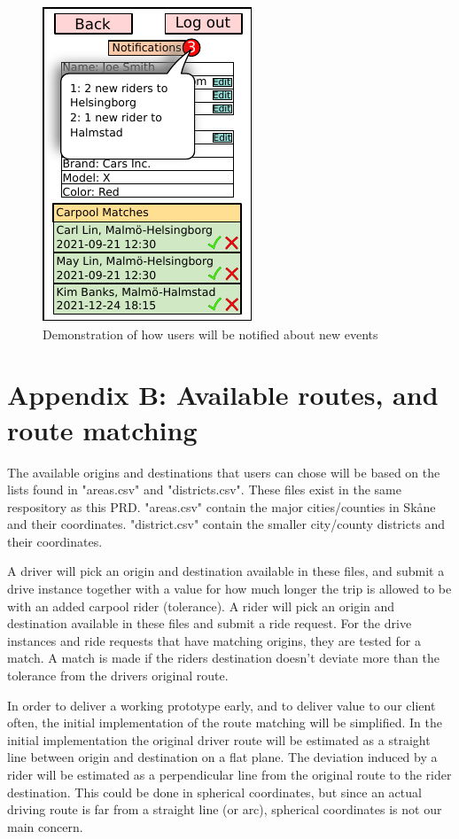 \documentclass{article}
\begin{document}
\begin{figure}[!htpb]
\begin{minipage}{0.25\textwidth}
        \centering
        \includegraphics[scale=1]{prdFigures/profile3.pdf}
        \caption{Demonstration of how users will be notified about new events}
        \label{fig:profile3}
    \end{minipage}\hfill
\end{figure}

\newpage
\section{Appendix B: Available routes, and route matching}
The available origins and destinations that users can chose will be based on the lists found in "areas.csv" and "districts.csv". These files exist in the same respository as this PRD. "areas.csv" contain the major cities/counties in Skåne and their coordinates. "district.csv" contain the smaller city/county districts and their coordinates.

A driver will pick an origin and destination available in these files, and submit a drive instance together with a value for how much longer the trip is allowed to be with an added carpool rider (tolerance). A rider will pick an origin and destination available in these files and submit a ride request. For the drive instances and ride requests that have matching origins, they are tested for a match. A match is made if the riders destination doesn't deviate more than the tolerance from the drivers original route.

In order to deliver a working prototype early, and to deliver value to our client often, the initial implementation of the route matching will be simplified. In the initial implementation the original driver route will be estimated as a straight line between origin and destination on a flat plane. The deviation induced by a rider will be estimated as a perpendicular line from the original route to the rider destination. This could be done in spherical coordinates, but since an actual driving route is far from a straight line (or arc), spherical coordinates is not our main concern.
\end{document}
